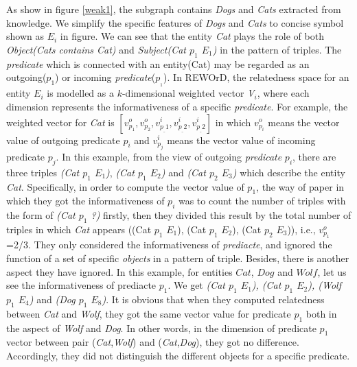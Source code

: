 As show in figure \ref{weak1}, the subgraph contains \emph{Dogs} and \emph{Cats} extracted from
knowledge. We simplify the specific features of \emph{Dogs} and \emph{Cats} to concise symbol shown as $E_i$ in figure. 
We can see that the entity \emph{Cat} plays the role 
of both \emph{Object(Cats contains Cat)} and \emph{Subject(Cat $p_1$ $E_1$)}
in the pattern of triples. The \emph{predicate} which is connected with an entity(Cat)
may be regarded as an outgoing($p_1$) or incoming \emph{predicate}($p_{_1}$).
In REWOrD\cite{aaai/Pirro12}, the relatedness space for an entity ${E_i}$ is modelled as a 
$k$-dimensional weighted vector \emph{V$_i$}, where each dimension represents
the informativeness of a specific \emph{predicate}.
For example, the weighted vector for \emph{Cat} is 
$[v_{p_1}^o, v_{p_2}^o, v_{p_\_1}^i, v_{p_\_2}^i, v_{p_\_2}^i]$ in which $v_{p_i}^o$ 
means the vector value of outgoing predicate $p_i$ and $v_{p_j}^i$ 
means the vector value of incoming predicate $p_j$.
In this example, from the view of outgoing \emph{predicate} $p_i$, there are three triples
\emph{(Cat $p_1$ $E_1$)}, \emph{(Cat $p_1$ $E_2$)} and \emph{(Cat $p_2$ $E_3$)} which describe the entity \emph{Cat}.
Specifically, in order to compute the vector value of $p_1$,
the way of paper \cite{aaai/Pirro12} in which they got the informativeness of $p_i$ was to count the number
of triples with the form of \emph{(Cat $p_1$ ?)} firstly, then they divided this result
by the total number of triples in which \emph{Cat} appears
((Cat $p_1$ $E_1$), (Cat $p_1$ $E_2$), (Cat $p_2$ $E_3$)), i.e., $v_{p_1}^o$=2/3.
They\cite{aaai/Pirro12} only considered the informativeness of \emph{prediacte},
and ignored the function of a set of specific \emph{objects} in a pattern of triple.
Besides, there is another aspect they have ignored. In this example, for entities $Cat$,
$Dog$ and $Wolf$, let us see the informativeness of prediacte $p_1$. We get
\emph{(Cat $p_1$ $E_1$), (Cat $p_1$ $E_2$), (Wolf $p_1$ $E_4$)} and \emph{(Dog $p_1$ $E_8$)}. 
It is obvious that when they\cite{aaai/Pirro12} computed relatedness between \emph{Cat} and \emph{Wolf}, 
they got the same vector value for predicate $p_1$ both in the aspect of \emph{Wolf} and \emph{Dog}.
In other words, in the dimension of predicate $p_1$ vector between pair (\emph{Cat},\emph{Wolf}) and
(\emph{Cat},\emph{Dog}), they got no difference. Accordingly, they did not distinguish the different
objects for a specific predicate. 

